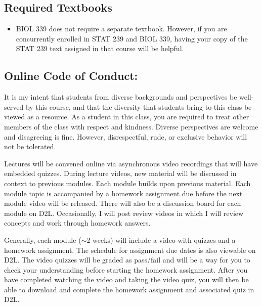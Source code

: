 \documentclass{tufte-handout}
\begin{document}
\begin{fullwidth}
\subsection{Required Textbooks}

\begin{itemize}
	\item BIOL 339 does not require a separate textbook. However, if you are concurrently enrolled in STAT 239 and BIOL 339, having your copy of the STAT 239 text assigned in that course will be helpful.
\end{itemize}










\subsection{Online Code of Conduct: } 

It is my intent that students from diverse backgrounds and perspectives be well-served by this course, and that the diversity that students bring to this class be viewed as a resource. As a student in this class, you are required to treat other members of the class with respect and kindness. Diverse perspectives are welcome and disagreeing is fine. However, disrespectful, rude, or exclusive behavior will not be tolerated. 




 Lectures will be convened online via asynchronous video recordings that will have embedded quizzes. During lecture videos, new material will be discussed in context to previous modules. Each module builds upon previous material. Each module topic is accompanied by a homework assignment due before the next module video will be released. There will also be a discussion board for each module on D2L. Occasionally, I will post review videos in which I will review concepts and work through homework answers. 

Generally, each module ($\sim$2 weeks) will include a video with quizzes and a homework assignment.  The schedule for assignment due dates is also viewable on D2L. The video quizzes will be graded as pass/fail and will be a way for you to check your understanding before starting the homework assignment. After you have completed watching the video and taking the video quiz, you will then be able to download and complete the homework assignment and associated quiz in D2L. 

\end{fullwidth}
\end{document}
